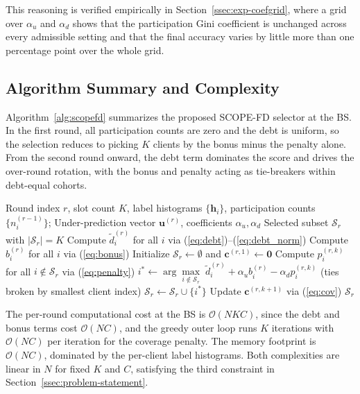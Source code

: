\documentclass[journal]{IEEEtran}
\newcommand{\rev}[1]{#1}
\begin{document}
\rev{This reasoning is verified empirically in Section~\ref{ssec:exp-coefgrid}, where a grid over $\alpha_u$ and $\alpha_d$ shows that the participation Gini coefficient is unchanged across every admissible setting and that the final accuracy varies by little more than one percentage point over the whole grid.}

\subsection{Algorithm Summary and Complexity}
\label{ssec:algorithm-summary}

Algorithm~\ref{alg:scopefd} summarizes the proposed SCOPE-FD selector at the BS. In the first round, all participation counts are zero and the debt is uniform, so the selection reduces to picking $K$ clients by the bonus minus the penalty alone. From the second round onward, the debt term dominates the score and drives the over-round rotation, with the bonus and penalty acting as tie-breakers within debt-equal cohorts.

\begin{algorithm}[t]
\caption{\small SCOPE-FD Selector at Round $r$}
\label{alg:scopefd}
\begin{algorithmic}[1]
\small
\REQUIRE Round index $r$, slot count $K$, label histograms $\{\bm{h}_i\}$, participation counts $\{n_i^{(r-1)}\}$;
\REQUIRE Under-prediction vector $\bm{u}^{(r)}$, coefficients $\alpha_u, \alpha_d$
\ENSURE Selected subset $\mathcal{S}_r$ with $|\mathcal{S}_r|=K$
\STATE Compute $\tilde{d}_i^{(r)}$ for all $i$ via (\ref{eq:debt})--(\ref{eq:debt_norm})
\STATE Compute $b_i^{(r)}$ for all $i$ via (\ref{eq:bonus})
\STATE Initialize $\mathcal{S}_r \leftarrow \emptyset$ and $\bm{c}^{(r,1)} \leftarrow \bm{0}$
    \STATE Compute $p_i^{(r,k)}$ for all $i \notin \mathcal{S}_r$ via (\ref{eq:penalty})
    \STATE $i^{*} \leftarrow \arg\max\limits_{i \notin \mathcal{S}_r}\;\tilde{d}_i^{(r)} + \alpha_u b_i^{(r)} - \alpha_d p_i^{(r,k)}$ (ties broken by smallest client index)
    \STATE $\mathcal{S}_r \leftarrow \mathcal{S}_r \cup \{i^{*}\}$
    \STATE Update $\bm{c}^{(r,k+1)}$ via (\ref{eq:cov})
\ENDFOR
\RETURN $\mathcal{S}_r$
\end{algorithmic}
\end{algorithm}

The per-round computational cost at the BS is $\mathcal{O}(NKC)$, since the debt and bonus terms cost $\mathcal{O}(NC)$, and the greedy outer loop runs $K$ iterations with $\mathcal{O}(NC)$ per iteration for the coverage penalty. The memory footprint is $\mathcal{O}(NC)$, dominated by the per-client label histograms. Both complexities are linear in $N$ for fixed $K$ and $C$, satisfying the third constraint in Section~\ref{ssec:problem-statement}.
\end{document}
